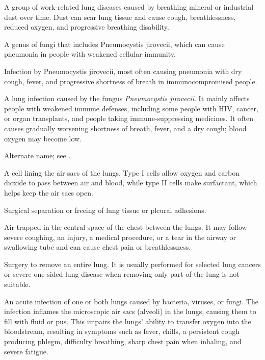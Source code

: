  A group of work-related lung diseases caused by breathing mineral or industrial dust over time. Dust can scar lung tissue and cause cough, breathlessness, reduced oxygen, and progressive breathing disability.

 A genus of fungi that includes Pneumocystis jirovecii, which can cause pneumonia in people with weakened cellular immunity.

 Infection by Pneumocystis jirovecii, most often causing pneumonia with dry cough, fever, and progressive shortness of breath in immunocompromised people.

 A lung infection caused by the fungus \textit{Pneumocystis jirovecii}. It mainly affects people with weakened immune defenses, including some people with HIV, cancer, or organ transplants, and people taking immune-suppressing medicines. It often causes gradually worsening shortness of breath, fever, and a dry cough; blood oxygen may become low.

 Alternate name; see .

 A cell lining the air sacs of the lungs. Type I cells allow oxygen and carbon dioxide to pass between air and blood, while type II cells make surfactant, which helps keep the air sacs open.

 Surgical separation or freeing of lung tissue or pleural adhesions.

 Air trapped in the central space of the chest between the lungs. It may follow severe coughing, an injury, a medical procedure, or a tear in the airway or swallowing tube and can cause chest pain or breathlessness.

 Surgery to remove an entire lung. It is usually performed for selected lung cancers or severe one-sided lung disease when removing only part of the lung is not suitable.

 An acute infection of one or both lungs caused by bacteria, viruses, or fungi. The infection inflames the microscopic air sacs (alveoli) in the lungs, causing them to fill with fluid or pus. This impairs the lungs' ability to transfer oxygen into the bloodstream, resulting in symptoms such as fever, chills, a persistent cough producing phlegm, difficulty breathing, sharp chest pain when inhaling, and severe fatigue.

